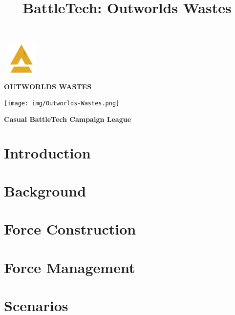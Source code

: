 \documentclass{article}
\title{BattleTech: Outworlds Wastes}
\author{}
\date{}
\newcommand{\mysectiontitle}{}
\newcommand{\newsection}[2]{\renewcommand{\mysectiontitle}{#2}\section{#1}}
\begin{document}
\makeatletter
{}

\begin{center}
  \mbox{
\fontsize{50}{60}\bfseries{}\includegraphics[alt='a', width=0.6in, height=0.6in]{img/Battletech-A.png}\fontsize{50}{60}\bfseries{}
}

  \fontsize{30}{37}\bfseries\selectfont\MakeUppercase{Outworlds Wastes}

  \texttt{[image: img/Outworlds-Wastes.png]}

  \LARGE\bfseries{Casual BattleTech Campaign League}
\end{center}

\newsection{Introduction}{introduction}



\newpage

\newsection{Background}{background}



\newsection{Force Construction}{force-construction}



\newpage

\newsection{Force Management}{force-management}



\newpage

\newsection{Scenarios}{scenarios}
\label{sec:scenarios}
\end{document}
